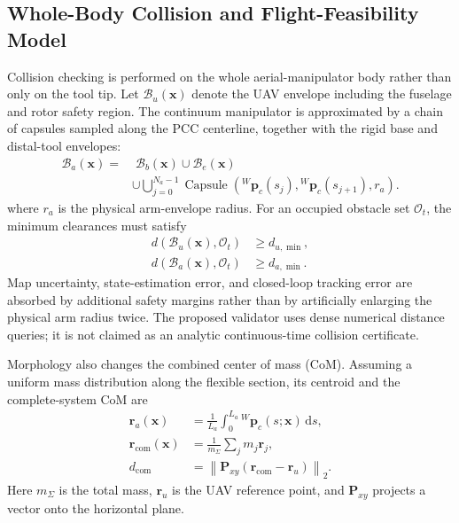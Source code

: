 \documentclass[journal,twoside]{IEEEtran}
\begin{document}
\subsection{Whole-Body Collision and Flight-Feasibility Model}
Collision checking is performed on the whole aerial-manipulator body rather than only on the tool tip. Let $\mathcal B_u(\mathbf x)$ denote the UAV envelope including the fuselage and rotor safety region. The continuum manipulator is approximated by a chain of capsules sampled along the PCC centerline, together with the rigid base and distal-tool envelopes:
\begin{equation}
\begin{aligned}
\mathcal B_a(\mathbf x)=&\;\mathcal B_b(\mathbf x)
\cup\mathcal B_e(\mathbf x)\\
&\cup\bigcup_{j=0}^{N_a-1}\operatorname{Capsule}\!\left(
{}^{W}\mathbf p_c(s_j),{}^{W}\mathbf p_c(s_{j+1}),r_a\right).
\end{aligned}
\label{eq:arm_envelope}
\end{equation}
where $r_a$ is the physical arm-envelope radius. For an occupied obstacle set $\mathcal O_t$, the minimum clearances must satisfy
\begin{equation}
\begin{aligned}
 d\!\left(\mathcal B_u(\mathbf x),\mathcal O_t\right)&\ge d_{u,\min},\\
 d\!\left(\mathcal B_a(\mathbf x),\mathcal O_t\right)&\ge d_{a,\min}.
\end{aligned}
\label{eq:clearance_constraints}
\end{equation}
Map uncertainty, state-estimation error, and closed-loop tracking error are absorbed by additional safety margins rather than by artificially enlarging the physical arm radius twice. The proposed validator uses dense numerical distance queries; it is not claimed as an analytic continuous-time collision certificate.

Morphology also changes the combined center of mass (CoM). Assuming a uniform mass distribution along the flexible section, its centroid and the complete-system CoM are
\begin{align}
\mathbf r_a(\mathbf x)
&=\frac{1}{L_a}\int_0^{L_a}{}^{W}\mathbf p_c(s;\mathbf x)\,\mathrm ds,
\label{eq:arm_com}\\
\mathbf r_{\mathrm{com}}(\mathbf x)
&=\frac{1}{m_\Sigma}\sum_j m_j\mathbf r_j,
\label{eq:system_com}\\
 d_{\mathrm{com}}
&=\left\|\mathbf P_{xy}(\mathbf r_{\mathrm{com}}-\mathbf r_u)\right\|_2.
\label{eq:com_offset}
\end{align}
Here $m_\Sigma$ is the total mass, $\mathbf r_u$ is the UAV reference point, and $\mathbf P_{xy}$ projects a vector onto the horizontal plane.
\end{document}
